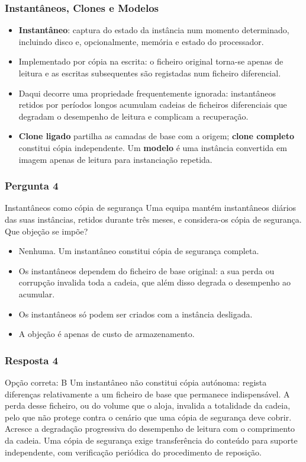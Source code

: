 \documentclass[aspectratio=169]{beamer}
\begin{document}
\begin{frame}
\frametitle{Instantâneos, Clones e Modelos}
\begin{itemize}
    \setlength\itemsep{0.35cm}
    \item \textbf{Instantâneo}: captura do estado da instância num momento determinado, incluindo disco e, opcionalmente, memória e estado do processador.
    \item Implementado por cópia na escrita: o ficheiro original torna-se apenas de leitura e as escritas subsequentes são registadas num ficheiro diferencial.
    \item Daqui decorre uma propriedade frequentemente ignorada: instantâneos retidos por períodos longos acumulam cadeias de ficheiros diferenciais que degradam o desempenho de leitura e complicam a recuperação.
    \item \textbf{Clone ligado} partilha as camadas de base com a origem; \textbf{clone completo} constitui cópia independente. Um \textbf{modelo} é uma instância convertida em imagem apenas de leitura para instanciação repetida.
\end{itemize}
\end{frame}

\begin{frame}
\frametitle{Pergunta 4}
\begin{pergunta}{Instantâneos como cópia de segurança}
Uma equipa mantém instantâneos diários das suas instâncias, retidos durante três meses, e considera-os cópia de segurança. Que objeção se impõe?
\begin{itemize}
    \item[A)] Nenhuma. Um instantâneo constitui cópia de segurança completa.
    \item[B)] Os instantâneos dependem do ficheiro de base original: a sua perda ou corrupção invalida toda a cadeia, que além disso degrada o desempenho ao acumular.
    \item[C)] Os instantâneos só podem ser criados com a instância desligada.
    \item[D)] A objeção é apenas de custo de armazenamento.
\end{itemize}
\end{pergunta}
\end{frame}

\begin{frame}
\frametitle{Resposta 4}
\begin{resposta}{Opção correta: B}
Um instantâneo não constitui cópia autónoma: regista diferenças relativamente a um ficheiro de base que permanece indispensável. A perda desse ficheiro, ou do volume que o aloja, invalida a totalidade da cadeia, pelo que não protege contra o cenário que uma cópia de segurança deve cobrir. Acresce a degradação progressiva do desempenho de leitura com o comprimento da cadeia. Uma cópia de segurança exige transferência do conteúdo para suporte independente, com verificação periódica do procedimento de reposição.
\end{resposta}
\end{frame}
\end{document}
